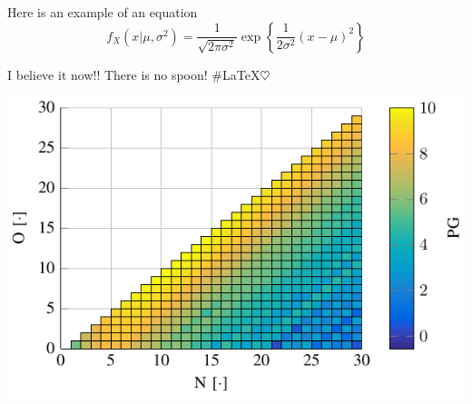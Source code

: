 Here is an example of an equation
\begin{equation}
f_X(x|\mu,\sigma^2) = \frac{1}{\sqrt{2\pi\sigma^2}}\exp\left\{\frac{1}{2\sigma^2}(x-\mu)^2\right\}
\end{equation}

 \begin{minipage}{.25\textwidth}
 	I believe it now!! There is no spoon! \#\LaTeX $\heartsuit$
 \end{minipage}%
 \begin{minipage}{.75\textwidth}
 	\includegraphics[width=\textwidth]{figures/HammingNOP10}
 \end{minipage}